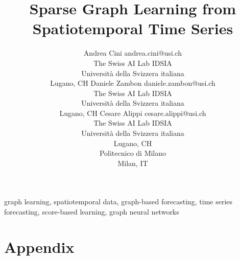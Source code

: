 \documentclass[twoside,11pt]{article}
\begin{document}


\title{Sparse Graph Learning from Spatiotemporal Time Series}

\author{\name Andrea Cini \email andrea.cini@usi.ch \\
       \addr The Swiss AI Lab IDSIA\\
       Universit\`a della Svizzera italiana\\
       Lugano, CH
       \AND
\name Daniele Zambon \email daniele.zambon@usi.ch \\
       \addr The Swiss AI Lab IDSIA\\
       Universit\`a della Svizzera italiana\\
       Lugano, CH
       \AND
\name Cesare Alippi \email cesare.alippi@usi.ch \\
       \addr The Swiss AI Lab IDSIA\\
       Universit\`a della Svizzera italiana\\
       Lugano, CH\\
       \addr Politecnico di Milano\\
       Milan, IT
}


\maketitle



\begin{keywords}
    graph learning, spatiotemporal data, graph-based forecasting, time series forecasting, score-based learning, graph neural networks
\end{keywords}





\appendix


\section*{Appendix}




\end{document}
